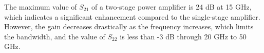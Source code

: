 The maximum value of $S_{21}$ of a two-stage power amplifier is 24 dB at 15 GHz, which indicates a significant enhancement compared to the single-stage amplifier. However, the gain decreases drastically as the frequency increases, which limits the bandwidth, and the value of $S_{22}$ is less than -3 dB through 20 GHz to 50 GHz.

